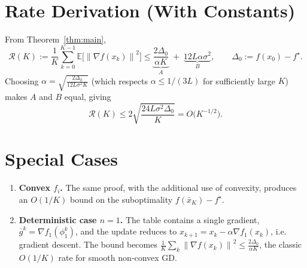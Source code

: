 \documentclass{article}
\newcommand{\E}{\mathbb{E}}
\newcommand{\norm}[1]{\left\|#1\right\|}
\newcommand{\grad}{\nabla}
\begin{document}
\section*{Rate Derivation (With Constants)}
From Theorem~\ref{thm:main},
\[
\mathcal{R}(K):=
\frac{1}{K}\sum_{k=0}^{K-1}\E\!\bigl[\norm{\grad f(x_k)}^{2}\bigr]
\le \underbrace{\frac{2\Delta_{0}}{\alpha K}}_{A}
\;+\;\underbrace{12L\alpha\sigma^{2}}_{B},
\qquad \Delta_{0}:=f(x_{0})-f^{\star}.
\]
Choosing $\alpha = \sqrt{\frac{2\Delta_{0}}{12L\sigma^{2}K}}$ (which respects $\alpha\le 1/(3L)$ for sufficiently large $K$) makes $A$ and $B$ equal, giving
\[
\mathcal{R}(K)\le 2\sqrt{\frac{24L\sigma^{2}\Delta_{0}}{K}}
= O\!\bigl(K^{-1/2}\bigr).
\]

\section*{Special Cases}
\begin{enumerate}
\item \textbf{Convex $f_i$.} The same proof, with the additional use of convexity,
produces an $O(1/K)$ bound on the suboptimality $f(\bar x_K)-f^{\star}$.
\item \textbf{Deterministic case $n=1$.} The table contains a single gradient, $\bar g^{k}=\grad f_{1}(\phi_{1}^{k})$, and the update reduces to
$x_{k+1}=x_k-\alpha\grad f_{1}(x_k)$, i.e. gradient descent.
The bound becomes $\frac{1}{K}\sum_{k}\norm{\grad f(x_k)}^{2}\le \frac{2\Delta_{0}}{\alpha K}$,
the classic $O(1/K)$ rate for smooth non‑convex GD.
\end{enumerate}
\end{document}
